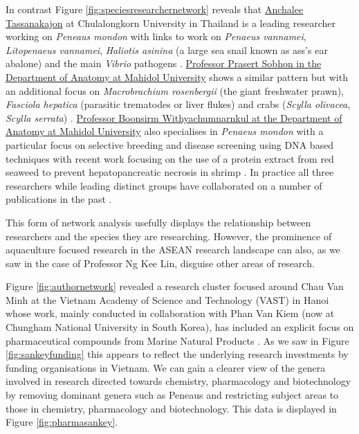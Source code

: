 \documentclass[]{book}
\theoremstyle{definition}
\theoremstyle{definition}
\theoremstyle{definition}
\theoremstyle{remark}
\begin{document}
In contrast Figure \ref{fig:speciesresearchernetwork} reveals that
\href{http://www.bc.sc.chula.ac.th/11Anchalee.html}{Anchalee
Tassanakajon} at Chulalongkorn University in Thailand is a leading
researcher working on \emph{Peneaus mondon} with links to work on
\emph{Penaeus vannamei}, \emph{Litopenaeus vannamei}, \emph{Haliotis
asinina} (a large sea snail known as ass's ear abalone) and the main
\emph{Vibrio} pathogens
\citep{Wongteerasupaya_1995, Supungul_2004, Kaewkascholkul_2016}.
\href{http://www.sc.mahidol.ac.th/scan/old/Prasert.htm}{Professor
Prasert Sobhon in the Department of Anatomy at Mahidol University} shows
a similar pattern but with an additional focus on \emph{Macrobrachium
rosenbergii} (the giant freshwater prawn), \emph{Fasciola hepatica}
(parasitic trematodes or liver flukes) and crabs (\emph{Scylla
olivacea}, \emph{Scylla serrata})
\citep{Meeratana_2006, Duangprom_2017, Preyavichyapugdee_2008}.
\href{http://www.sc.mahidol.ac.th/scan/old/Boonsirm.htm}{Professor
Boonsirm Withyachumnarnkul at the Department of Anatomy at Mahidol
University} also specialises in \emph{Penaeus mondon} with a particular
focus on selective breeding and disease screening using DNA based
techniques \citep{Wongteerasupaya_1995} with recent work focusing on the
use of a protein extract from red seaweed to prevent hepatopancreatic
necrosis in shrimp \citep{Boonsri_2016}. In practice all three
researchers while leading distinct groups have collaborated on a number
of publications in the past
\citep{Wongteerasupaya_1995, Pongtippatee_2007, Wongteerasupaya_1997}.

This form of network analysis usefully displays the relationship between
researchers and the species they are researching. However, the
prominence of aquaculture focused research in the ASEAN research
landscape can also, as we saw in the case of Professor Ng Kee Lin,
disguise other areas of research.

Figure \ref{fig:authornetwork} revealed a research cluster focused
around Chau Van Minh at the Vietnam Academy of Science and Technology
(VAST) in Hanoi whose work, mainly conducted in collaboration with Phan
Van Kiem (now at Chungham National University in South Korea), has
included an explicit focus on pharmaceutical compounds from Marine
Natural Products
\citep{Van_Minh_2017, Quang_2011, Thao_2015, Thao_2015a}. As we saw in
Figure \ref{fig:sankeyfunding} this appears to reflect the underlying
research investments by funding organisations in Vietnam. We can gain a
clearer view of the genera involved in research directed towards
chemistry, pharmacology and biotechnology by removing dominant genera
such as Peneaus and restricting subject areas to those in chemistry,
pharmacology and biotechnology. This data is displayed in Figure
\ref{fig:pharmasankey}.
\end{document}
